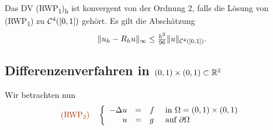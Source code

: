 \documentclass{cheat-sheet}
\newcommand{\Cont}{\mathcal{C}} %
\newcommand{\bOmega}{\partial \Omega} %
\newcommand{\Laplace}{\Delta}
\newcommand{\tss}[1]{\textsubscript{#1}} %
\newcommand{\probl}[1]{\textcolor{ProblemColor}{#1}}
\begin{document}

\begin{satz}
  Das DV (RWP\tss{1})\tss{h} ist konvergent von der Ordnung 2, falls die Lösung von (RWP\tss{1}) zu $\Cont^4(\cinterval{0}{1})$ gehört.
  Es gilt die Abschätzung
  \[ \norm{u_h - R_h u}_\infty \leq \tfrac{h^2}{96} \norm{u}_{\Cont^4(\cinterval{0}{1})}. \]
\end{satz}

\subsection{Differenzenverfahren in $\left( 0, 1 \right) \times \left( 0, 1 \right) \subset \mathbb{R}^2$}

\begin{problem}
  Wir betrachten nun
  \[
    \text{\probl{(RWP\tss{2})}} \quad
    \left\{ \begin{array}{rlll}
      - \Laplace u &=& f &\text{ in $\Omega = \ointerval{0}{1} \times \ointerval{0}{1}$} \\
      u &=& g &\text{ auf $\bOmega$}
    \end{array} \right.
  \]
\end{problem}
\end{document}
